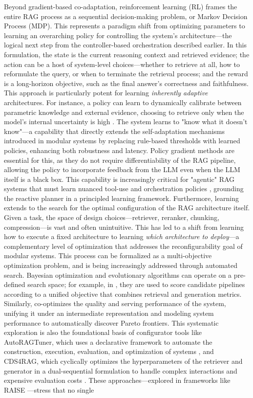 \documentclass[11pt,a4paper]{article}
\begin{document}
Beyond gradient-based co-adaptation, reinforcement learning (RL) frames the entire RAG process as a sequential decision-making problem, or Markov Decision Process (MDP). This represents a paradigm shift from optimizing parameters to learning an overarching policy for controlling the system's architecture---the logical next step from the controller-based orchestration described earlier. In this formulation, the state is the current reasoning context and retrieved evidence; the action can be a host of system-level choices---whether to retrieve at all, how to reformulate the query, or when to terminate the retrieval process; and the reward is a long-horizon objective, such as the final answer's correctness and faithfulness. This approach is particularly potent for learning \emph{inherently adaptive} architectures. For instance, a policy can learn to dynamically calibrate between parametric knowledge and external evidence, choosing to retrieve only when the model's internal uncertainty is high \cite{arxiv:2506.06704v1}. The system learns to "know what it doesn't know"---a capability that directly extends the self-adaptation mechanisms introduced in modular systems by replacing rule-based thresholds with learned policies, enhancing both robustness and latency. Policy gradient methods are essential for this, as they do not require differentiability of the RAG pipeline, allowing the policy to incorporate feedback from the LLM even when the LLM itself is a black box. This capability is increasingly critical for "agentic" RAG systems that must learn nuanced tool-use and orchestration policies \cite{arxiv:2506.10408v1}, grounding the reactive planner in a principled learning framework. Furthermore, learning extends to the search for the optimal configuration of the RAG architecture itself. Given a task, the space of design choices---retriever, reranker, chunking, compression---is vast and often unintuitive. This has led to a shift from learning how to execute a fixed architecture to learning \emph{which architecture to deploy}---a complementary level of optimization that addresses the reconfigurability goal of modular systems. This process can be formalized as a multi-objective optimization problem, and is being increasingly addressed through automated search. Bayesian optimization and evolutionary algorithms can operate on a pre-defined search space; for example, in \cite{arxiv:2510.12323v1}, they are used to score candidate pipelines according to a unified objective that combines retrieval and generation metrics. Similarly, \cite{arxiv:2510.20296v1} co-optimizes the quality and serving performance of the system, unifying it under an intermediate representation and modeling system performance to automatically discover Pareto frontiers. This systematic exploration is also the foundational basis of configurator tools like AutoRAGTuner, which uses a declarative framework to automate the construction, execution, evaluation, and optimization of systems \cite{arxiv:2605.02967v1}, and CDS4RAG, which cyclically optimizes the hyperparameters of the retriever and generator in a dual-sequential formulation to handle complex interactions and expensive evaluation costs \cite{arxiv:2605.08333v1}. These approaches---explored in frameworks like RAISE \cite{arxiv:2605.30029v1}---stress that no single 
\end{document}
